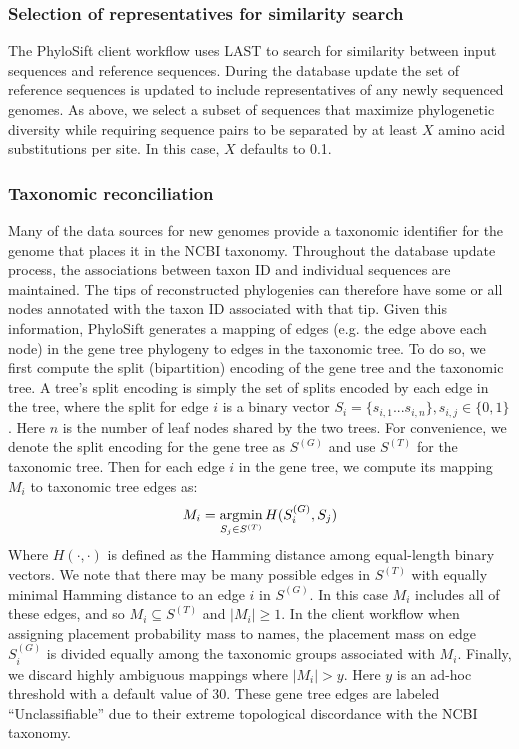 \documentclass[10pt]{article}
\newcommand{\argmin}{\operatornamewithlimits{argmin}}
\begin{document}
\subsubsection*{Selection of representatives for similarity search}
The PhyloSift client workflow uses LAST to search for similarity between input sequences and reference sequences.
During the database update the set of reference sequences is updated to include representatives of any newly sequenced genomes.
As above, we select a subset of sequences that maximize phylogenetic diversity while requiring sequence pairs to be separated by at least $X$ amino acid substitutions per site.
In this case, $X$ defaults to 0.1.

\subsubsection*{Taxonomic reconciliation}
Many of the data sources for new genomes provide a taxonomic identifier for the genome that places it in the NCBI taxonomy.
Throughout the database update process, the associations between taxon ID and individual sequences are maintained.
The tips of reconstructed phylogenies can therefore have some or all nodes annotated with the taxon ID associated with that tip.
Given this information, PhyloSift generates a mapping of edges (e.g. the edge above each node) in the gene tree phylogeny to edges in the taxonomic tree.
To do so, we first compute the split (bipartition) encoding of the gene tree and the taxonomic tree.
A tree's split encoding is simply the set of splits encoded by each edge in the tree, where the split for edge $i$ is a binary vector $S_i = \{s_{i,1}...s_{i,n}\}, s_{i,j} \in \{0,1\}$.
Here $n$ is the number of leaf nodes shared by the two trees.
For convenience, we denote the split encoding for the gene tree as $S^{(G)}$ and use $S^{(T)}$ for the taxonomic tree.
Then for each edge $i$ in the gene tree, we compute its mapping $M_i$ to taxonomic tree edges as:
$$
M_i = \argmin_{S_j \in S^{(T)}} H(S^{(G)}_i, S_j)
$$
Where $H(\cdot,\cdot)$ is defined as the Hamming distance among equal-length binary vectors.
We note that there may be many possible edges in $S^{(T)}$ with equally minimal Hamming distance to an edge $i$ in $S^{(G)}$.
In this case $M_i$ includes all of these edges, and so $M_i \subseteq S^{(T)}$ and $|M_i| \geq 1$.
In the client workflow when assigning placement probability mass to names, the placement mass on edge $S^{(G)}_i$ is divided equally among the taxonomic groups associated with $M_i$.
Finally, we discard highly ambiguous mappings where $|M_i|>y$.
Here $y$ is an ad-hoc threshold with a default value of 30.
These gene tree edges are labeled ``Unclassifiable'' due to their extreme topological discordance with the NCBI taxonomy.
\end{document}
